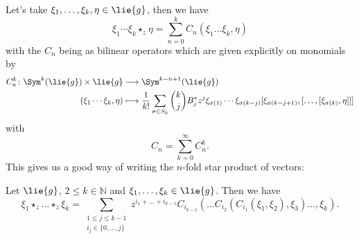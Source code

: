 Let's take $\xi_1, \ldots, \xi_k, \eta \in \lie{g}$, then we have
\begin{equation*}
	\xi_1 \cdots \xi_k \star_z \eta
	=
	\sum\limits_{n = 0}^k 
	C_n \left( \xi_1 \ldots \xi_k, \eta \right)
\end{equation*}
with the $C_n$ being as bilinear operators which are given explicitly 
on monomials by
\begin{align}
	\label{Formulas:MultipleStarDef1}
	C_n^k
	\colon
	\Sym^k(\lie{g})
	\times
	\lie{g}
	& 
	\longrightarrow
	\Sym^{k - n + 1}(\lie{g})
	\\
	\label{Formulas:MultipleStarDef2}
	(\xi_1 \cdots \xi_k, \eta)
	&
	\longmapsto
	\frac{1}{k!}
	\sum\limits_{\sigma \in S_k}
	\binom{k}{j} B_j^* z^j
	\xi_{\sigma(1)} \cdots \xi_{\sigma(k-j)}
	[\xi_{\sigma(k-j+1)}, [ \ldots, [\xi_{\sigma(k)}, \eta]]] 
\end{align}
with
\begin{equation*}
	C_n 
	= 
	\sum\limits_{k = 0}^{\infty}
	C_n^k.
\end{equation*}
This gives us a good way of writing the $n$-fold star product of vectors:
\begin{proposition}
	\label{Formulas:Prop:MultipleStars}
	Let $\lie{g}$, $2 \leq k \in \mathbb{N}$  and $\xi_1, \ldots, \xi_k 
	\in \lie{g}$. Then we have
	\begin{equation}
		\label{Formulas:MultipleStars}
		\xi_1 \star_z \ldots \star_z \xi_k		
		=
		\sum\limits_{\substack{
			1 \leq j \leq k-1 \\
			i_j \in \{0, \ldots, j\}
		}}
		z^{i_1 + \ldots + i_{k-1}}
		C_{i_{k-1}}
		\left(
			\ldots C_{i_2}
			\left(
				C_{i_1}
				\left( \xi_1, \xi_2 \right)
				, \xi_3	
			\right) 
			\ldots, \xi_{k}
		\right).
	\end{equation}
\end{proposition}
